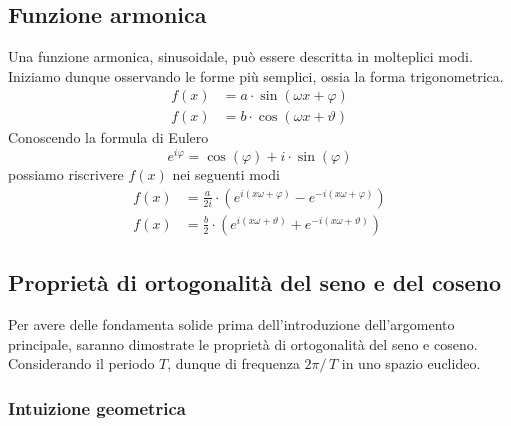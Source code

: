 \subsection{Funzione armonica}
Una funzione armonica, sinusoidale, pu\`o essere descritta in molteplici modi.
Iniziamo dunque osservando le forme pi\`u semplici, ossia la forma
trigonometrica.
\begin{align*}
    f(x) &= a\cdot\sin (\omega x + \varphi) \\
    f(x) &= b\cdot\cos(\omega x + \vartheta)
\end{align*}
Conoscendo la formula di Eulero 
\[
    e^{i\varphi} = \cos(\varphi) + i\cdot\sin(\varphi)
\]
possiamo riscrivere \(f(x)\) nei seguenti modi
\begin{align*}
    f(x) &= \frac{a}{2i}\cdot(e^{i(x\omega + \varphi)} - e^{-i(x\omega + \varphi)}) \\
    f(x) &= \frac{b}{2}\cdot(e^{i(x\omega + \vartheta)} + e^{-i(x\omega + \vartheta)})
\end{align*}

\subsection{Propriet\`a di ortogonalit\`a del seno e del coseno}
Per avere delle fondamenta solide prima dell'introduzione dell'argomento
principale, saranno dimostrate le propriet\`a di ortogonalit\`a del seno e
coseno. Considerando il periodo \(T\), dunque di frequenza \(2\pi /\,T\)
in uno spazio euclideo.

\subsubsection{Intuizione geometrica}

